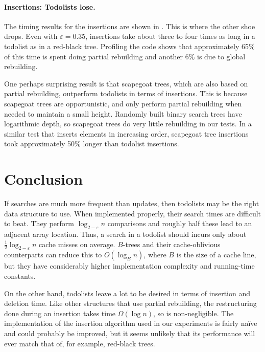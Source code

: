 \documentclass{patmorin}
\newcommand{\eps}{\varepsilon}
\begin{document}
\paragraph{Insertions: Todolists lose.}
The timing results for the insertions are shown in
. This is where the other shoe drops.  Even with
$\eps=0.35$, insertions take about three to four times as long in
a todolist as in a red-black tree.  Profiling the code shows that
approximately 65\% of this time is spent doing partial rebuilding and
another 6\% is due to global rebuilding.

One perhaps surprising result is that scapegoat trees, which are also
based on partial rebuilding, outperform todolists in terms of insertions.
This is because scapegoat trees are opportunistic, and only perform
partial rebuilding when needed to maintain a small height.  Randomly built
binary search trees have logarithmic depth, so scapegoat trees do very
little rebuilding in our tests.  In a similar test that inserts elements
in increasing order, scapegoat tree insertions took approximately 50\%
longer than todolist insertions.


\section{Conclusion}

If searches are much more frequent than updates, then todolists may
be the right data structure to use.  When implemented properly, their
search times are difficult to beat.  They perform $\log_{2-\eps}
n$ comparisons and roughly half these lead to an adjacent array
location. Thus, a search in a todolist should incurs only about
$\frac{1}{2}\log_{2-\eps} n$ cache misses on average.   $B$-trees
\cite{bayer.mccreight:organization} and their cache-oblivious counterparts
\cite{bender.demaine.ea:cache-oblivious,bender.duan.ea:locality-preserving}
can reduce this to $O(\log_B n)$, where $B$ is the size of a cache line,
but they have considerably higher implementation complexity and running-time
constants.

On the other hand, todolists leave a lot to be desired in terms of
insertion and deletion time.  Like other structures that use partial
rebuilding, the restructuring done during an insertion takes time
$\Omega(\log n)$, so is non-negligible.  The implementation of the
insertion algorithm used in our experiments is fairly naïve and could
probably be improved, but it seems unlikely that its performance will
ever match that of, for example, red-black trees.
\end{document}

